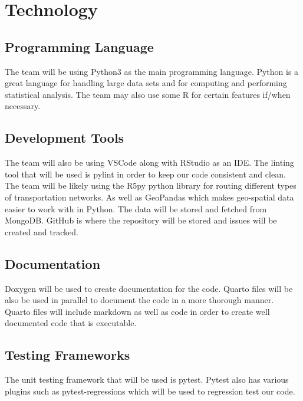 \documentclass{article}
\begin{document}



\section{Technology}%

\subsection{Programming Language}
The team will be using Python3 as the main programming language. Python is a great language for handling large data sets and for computing and performing statistical analysis. The team may also use some R for certain features if/when necessary.

\subsection{Development Tools}
 The team will also be using VSCode along with RStudio as an IDE. The linting tool that will be used is pylint in order to keep our code consistent and clean. The team will be likely using the R5py python library for routing different types of transportation networks. As well as GeoPandas which makes geo-spatial data easier to work with in Python. The data will be stored and fetched from MongoDB. GitHub is where the repository will be stored and issues will be created and tracked.
 
\subsection{Documentation}
Doxygen will be used to create documentation for the code. Quarto files will be also be used in parallel to document the code in a more thorough manner. Quarto files will include markdown as well as code in order to create well documented code that is executable.

\subsection{Testing Frameworks}
The unit testing framework that will be used is pytest. Pytest also has various plugins such as pytest-regressions which will be used to regression test our code.
 
\end{document}

